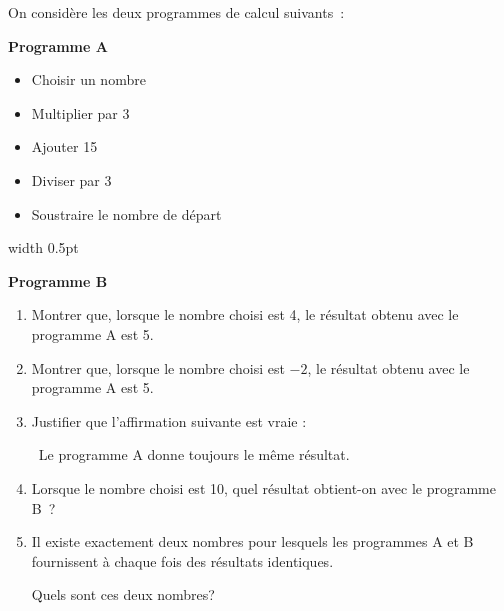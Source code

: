 \documentclass[exercice]{thedocument}%
\begin{document}
%
On considère les deux programmes de calcul suivants~:\par
\medskip\noindent
\begin{minipage}[t]{.45\linewidth}
    {\bfseries Programme A}
    \begin{itemize}[label= $\bullet~~$]
        \item Choisir un nombre
        \item Multiplier par 3
        \item Ajouter 15
        \item Diviser par 3
        \item Soustraire le nombre de départ
    \end{itemize}
\end{minipage}\hfil\vrule width 0.5pt\hfil
\begin{minipage}[t]{.45\linewidth}
    {\bfseries Programme B}\par\medskip
\end{minipage}\smallskip
\begin{enumerate}
\item Montrer que, lorsque le nombre choisi est 4, le résultat obtenu avec le
programme A est 5.
\item Montrer que, lorsque le nombre choisi est $- 2$, le résultat obtenu avec
le programme A est 5.
\item Justifier que l'affirmation suivante est vraie :
\begin{center}
    \guillemotleft\ Le programme A donne toujours le même résultat.
    \guillemotright
\end{center}
\item Lorsque le nombre choisi est 10, quel résultat obtient-on avec le
programme B~?
\item Il existe exactement deux nombres pour lesquels les programmes A et B
fournissent à chaque fois des résultats identiques.\par
Quels sont ces deux nombres?
\end{enumerate}
\showthesource
\end{document}
